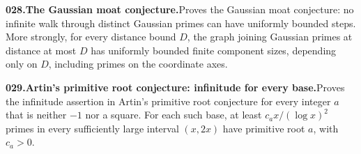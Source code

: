 \documentclass[11pt,a4paper]{article}
\begin{document}
  \par \begin{minipage}{\linewidth}
  \fontsize{10.5}{12.6}\selectfont\RaggedRight
  \hypertarget{result 028}{}
  {\bfseries\textcolor{muted}{028.}\enspace The Gaussian moat conjecture.}\enspace Proves the Gaussian moat conjecture: no infinite walk through distinct Gaussian primes can have uniformly bounded steps. More strongly, for every distance bound $D$, the graph joining Gaussian primes at distance at most $D$ has uniformly bounded finite component sizes, depending only on $D$, including primes on the coordinate axes.\par
  \end{minipage}\par\vspace{5pt}



  \par \begin{minipage}{\linewidth}
  \fontsize{10.5}{12.6}\selectfont\RaggedRight
  \hypertarget{result 029}{}
  {\bfseries\textcolor{muted}{029.}\enspace Artin's primitive root conjecture: infinitude for every base.}\enspace Proves the infinitude assertion in Artin's primitive root conjecture for every integer $a$ that is neither $-1$ nor a square. For each such base, at least $c_a x/(\log x)^2$ primes in every sufficiently large interval $(x,2x)$ have primitive root $a$, with $c_a>0$.\par
  \end{minipage}\par\vspace{5pt}
\end{document}
